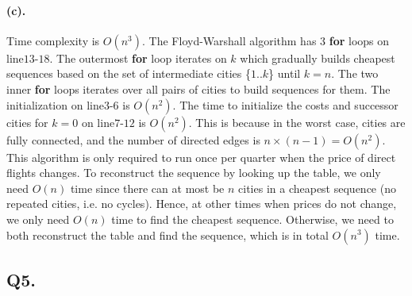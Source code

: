 \documentclass[12pt]{article}
\begin{document}
\paragraph{(c).}
Time complexity is \(O(n^3)\). The Floyd-Warshall algorithm has 3 \textbf{for} loops on line\(13\)-\(18\). The outermost \textbf{for} loop iterates on \(k\) which gradually builds cheapest sequences based on the set of intermediate cities \{\(1..k\)\} until \(k = n\). The two inner \textbf{for} loops iterates over all pairs of cities to build sequences for them. The initialization on line\(3\)-\(6\) is \(O(n^2)\). The time to initialize the costs and successor cities for \(k=0\) on line\(7\)-\(12\) is \(O(n^2)\). This is because in the worst case, cities are fully connected, and the number of directed edges is \(n \times (n-1) = O(n^2)\). This algorithm is only required to run once per quarter when the price of direct flights changes. To reconstruct the sequence by looking up the table, we only need \(O(n)\) time since there can at most be \(n\) cities in a cheapest sequence (no repeated cities, i.e. no cycles). Hence, at other times when prices do not change, we only need \(O(n)\) time to find the cheapest sequence. Otherwise, we need to both reconstruct the table and find the sequence, which is in total \(O(n^3)\) time.

\subsection*{Q5.}
\end{document}

